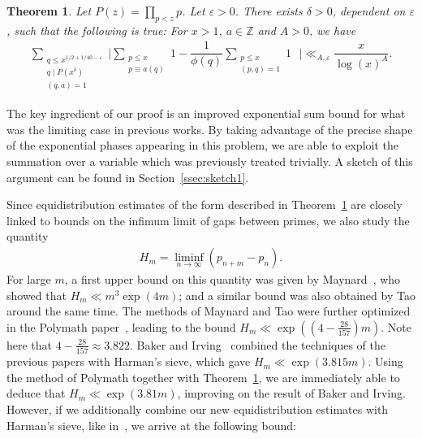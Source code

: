 \documentclass{amsart}
\newtheorem{thm}{Theorem}
\numberwithin{equation}{section}
\begin{document}
\begin{thm} \label{thm:equidistribution}
Let $P(z) = \prod_{p<z} p$. Let $\varepsilon>0$. There exists $\delta >0$, dependent on $\varepsilon$, such that the following is true: For $x>1$,  $a \in \mathbb{Z}$  and $A>0$, we have
\begin{align*}
\sum_{\substack{ q \leq x^{1/2 +1/40 -\varepsilon } \\ q \mid P(x^\delta) \\ (q,a)=1}} \Bigg| \sum_{\substack{ p \leq x \\ p \equiv a (q) }} 1 - \dfrac{1}{\phi(q)}\sum_{\substack{ p \leq x \\ (p,q)=1 }} 1  \,\,\,\, \Bigg| \ll_{A, \varepsilon} \dfrac{x}{\log(x)^A}.
\end{align*} 
\end{thm}
The key ingredient of our proof  is an improved exponential sum bound for what was the limiting case in previous works. By taking advantage of the precise shape of the exponential phases appearing in this problem, we are able to exploit the summation over a variable which was previously treated trivially. A sketch of this argument can be found in Section~\ref{ssec:sketch1}.

\vspace{3mm} Since equidistribution estimates of the form described in Theorem~\ref{thm:equidistribution} are closely linked to bounds on the infimum limit of gaps between primes, we also  study the quantity
\begin{align*}
H_m=\liminf_{n \rightarrow \infty} (p_{n+m}-p_n).
\end{align*}
For large $m$, a first upper bound on this quantity was given by Maynard~\cite{Maynard:2015:SGP}, who showed that $H_m \ll m^3 \exp(4m)$; and a similar bound was also obtained by Tao around the same time. The methods of Maynard and Tao were further optimized in the Polymath paper~\cite{Polymath:2014:VSS}, leading to the bound $H_m \ll \exp((4-\frac{28}{157})m)$. Note here that $4-\frac{28}{157} \approx 3.822$.  Baker and Irving~\cite{Baker:2017:BIP} combined the techniques of the previous papers with Harman's sieve, which gave  $H_m \ll \exp(3.815 m)$. Using the method of Polymath together with Theorem~\ref{thm:equidistribution}, we are immediately able to deduce that $H_m \ll \exp(3.81 m)$, improving on the result of Baker and Irving. However, if we additionally combine our new equidistribution estimates with Harman's sieve, like in~\cite{Baker:2017:BIP}, we arrive at the following bound:
\end{document}
